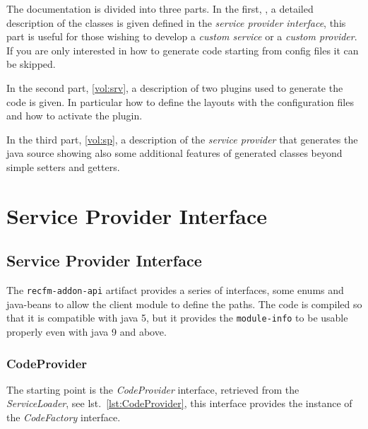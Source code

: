 \documentclass[a4paper,10pt]{report}
\begin{document}
The documentation is divided into three parts. In the first, \ref{vol:spi}, a 
detailed description of the classes is given defined in the 
\textsl{service provider interface}, this part is useful for those wishing to 
develop a \textit{custom service} or a \textit{custom provider}. 
If you are only interested in how to generate code starting from config files 
it can be skipped.

In the second part, \ref{vol:srv}, a description of two plugins used to generate 
the code is given. In particular how to define the layouts with the 
configuration files and how to activate the plugin.

In the third part, \ref{vol:sp}, a description of the \textsl{service provider} 
that generates the java source showing also some additional features of 
generated classes beyond simple setters and getters.

%

\clearpage

\tableofcontents

\clearpage

\part{Service Provider Interface}\label{vol:spi}

%                                           

\chapter{Service Provider Interface}
The \verb!recfm-addon-api! artifact provides a series of interfaces, some enums 
and java-beans to allow the client module to define the paths. 
The code is compiled so that it is compatible with java 5, but it provides the 
\verb!module-info! to be usable properly even with java 9 and above.

\section{CodeProvider}
The starting point is the \textsl{CodeProvider} interface, retrieved from the 
\textsl{ServiceLoader}, see lst.~\ref{lst:CodeProvider}, this interface
provides the instance of the \textsl{CodeFactory} interface.
\end{document}
